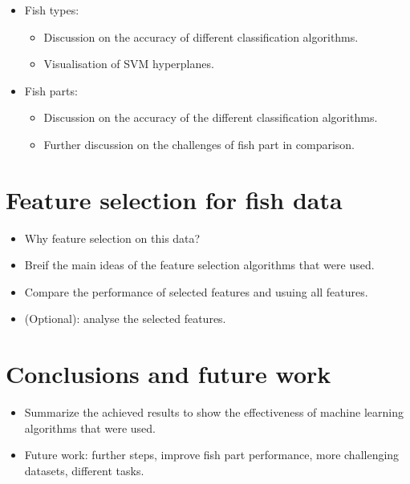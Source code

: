 \documentclass[runningheads]{llncs}
\begin{document}
\begin{itemize}
    \item Fish types: 
    \begin{itemize}
        \item Discussion on the accuracy of different classification algorithms. 
        \item Visualisation of SVM hyperplanes. 
    \end{itemize}
    \item Fish parts: 
    \begin{itemize}
        \item Discussion on the accuracy of the different classification algorithms. 
        \item Further discussion on the challenges of fish part in comparison. 
    \end{itemize}
\end{itemize}

\section{Feature selection for fish data}

\begin{itemize}
    \item Why feature selection on this data? 
    \item Breif the main ideas of the feature selection algorithms that were used. 
    \item Compare the performance of selected features and usuing all features. 
    \item (Optional): analyse the selected features. 
\end{itemize}

\section{Conclusions and future work}

\begin{itemize}
    \item Summarize the achieved results to show the effectiveness of machine learning algorithms that were used. 
    \item Future work: further steps, improve fish part performance, more challenging datasets, different tasks. 
\end{itemize}

\end{document}
